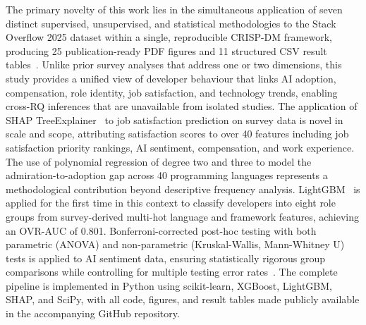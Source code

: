 \documentclass[journal, onecolumn]{IEEEtran}
\begin{document}
The primary novelty of this work lies in the simultaneous application of seven distinct supervised, unsupervised, and statistical methodologies to the Stack Overflow 2025 dataset within a single, reproducible CRISP-DM framework, producing 25 publication-ready PDF figures and 11 structured CSV result tables~\cite{wirth2000crisp}.
Unlike prior survey analyses that address one or two dimensions, this study provides a unified view of developer behaviour that links AI adoption, compensation, role identity, job satisfaction, and technology trends, enabling cross-RQ inferences that are unavailable from isolated studies.
The application of SHAP TreeExplainer~\cite{lundberg2017unified} to job satisfaction prediction on survey data is novel in scale and scope, attributing satisfaction scores to over 40 features including job satisfaction priority rankings, AI sentiment, compensation, and work experience.
The use of polynomial regression of degree two and three to model the admiration-to-adoption gap across 40 programming languages represents a methodological contribution beyond descriptive frequency analysis.
LightGBM~\cite{ke2017lightgbm} is applied for the first time in this context to classify developers into eight role groups from survey-derived multi-hot language and framework features, achieving an OVR-AUC of 0.801.
Bonferroni-corrected post-hoc testing with both parametric (ANOVA) and non-parametric (Kruskal-Wallis, Mann-Whitney U) tests is applied to AI sentiment data, ensuring statistically rigorous group comparisons while controlling for multiple testing error rates~\cite{kruskal1952use}.
The complete pipeline is implemented in Python using scikit-learn, XGBoost, LightGBM, SHAP, and SciPy, with all code, figures, and result tables made publicly available in the accompanying GitHub repository.
\end{document}
